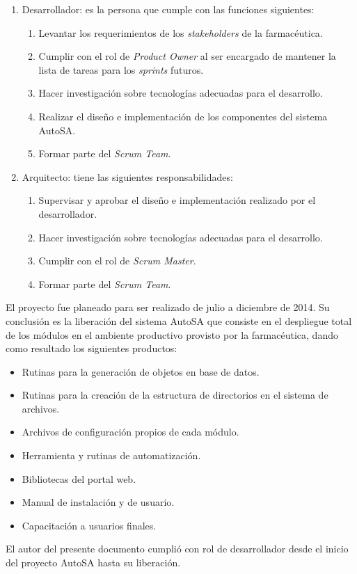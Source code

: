 \begin{enumerate}
	\item Desarrollador: es la persona que cumple con las funciones siguientes:
	\begin{enumerate}
		\item Levantar los requerimientos de los \textit{stakeholders} de la farmacéutica.
		\item Cumplir con el rol de \textit{Product Owner} al ser encargado de mantener la lista de tareas para los \textit{sprints} futuros.
		\item Hacer investigación sobre tecnologías adecuadas para el desarrollo.
		\item Realizar el diseño e implementación de los componentes del sistema AutoSA.
		\item Formar parte del \textit{Scrum Team}.
	\end{enumerate}
	\item Arquitecto: tiene las siguientes responsabilidades:
	\begin{enumerate}
		\item Supervisar y aprobar el diseño e implementación realizado por el desarrollador.
		\item Hacer investigación sobre tecnologías adecuadas para el desarrollo.
		\item Cumplir con el rol de \textit{Scrum Master}.
		\item Formar parte del \textit{Scrum Team}.
	\end{enumerate}
\end{enumerate}
El proyecto fue planeado para ser realizado de julio a diciembre de 2014. Su conclusión es la liberación del sistema AutoSA que consiste en el despliegue total de los módulos en el ambiente productivo provisto por la farmacéutica, dando como resultado los siguientes productos:
\begin{itemize}
\item Rutinas para la generación de objetos en base de datos.
\item Rutinas para la creación de la estructura de directorios en el sistema de archivos.
\item Archivos de configuración propios de cada módulo.
\item Herramienta y rutinas de automatización.
\item Bibliotecas del portal web.
\item Manual de instalación y de usuario.
\item Capacitación a usuarios finales.
\end{itemize}
El autor del presente documento cumplió con rol de desarrollador desde el inicio del proyecto AutoSA hasta su liberación.

